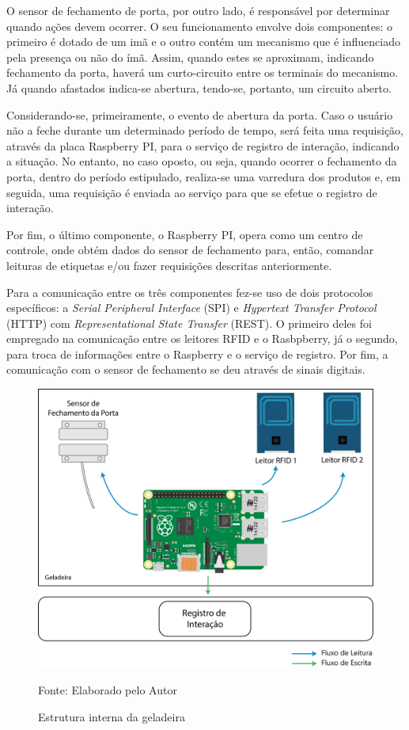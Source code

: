 O sensor de fechamento de porta, por outro lado, é responsável por determinar quando ações devem ocorrer. O seu funcionamento envolve dois componentes: o primeiro é dotado de um imã e o outro contém um mecanismo que é influenciado pela presença ou não do ímã. Assim, quando estes se aproximam, indicando fechamento da porta, haverá um curto-circuito entre os terminais do mecanismo. Já quando afastados indica-se abertura, tendo-se, portanto, um circuito aberto.

Considerando-se, primeiramente, o evento de abertura da porta. Caso o usuário não a feche durante um determinado período de tempo, será feita uma requisição, através da placa Raspberry PI, para o serviço de registro de interação, indicando a situação. No entanto, no caso oposto, ou seja, quando ocorrer o fechamento da porta, dentro do período estipulado, realiza-se uma varredura dos produtos e, em seguida, uma requisição é enviada ao serviço para que se efetue o registro de interação.

Por fim, o último componente, o Raspberry PI, opera como um centro de controle, onde obtém dados do sensor de fechamento para, então, comandar leituras de etiquetas e/ou fazer requisições descritas anteriormente.

Para a comunicação entre os três componentes fez-se uso de dois protocolos específicos: a \textit{Serial Peripheral Interface} (SPI) e \textit{Hypertext Transfer Protocol} (HTTP) com \textit{Representational State Transfer} (REST). O primeiro deles foi empregado na comunicação entre os leitores RFID e o Rasbpberry, já o segundo, para troca de informações entre o Raspberry e o serviço de registro. Por fim, a comunicação com o sensor de fechamento se deu através de sinais digitais.

\begin{figure}[H]
    \caption{Estrutura interna da geladeira}
    \label{fig:cap4_estr_geladeira}
    \includegraphics[width=\textwidth]{figuras/c4_modelo-logico-hardware.png}
    
    \footnotesize{Fonte: Elaborado pelo Autor}
\end{figure}

